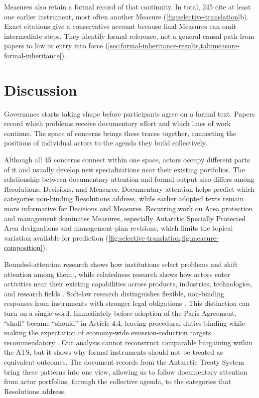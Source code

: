 \documentclass{fun_article}
\begin{document}
Measures also retain a formal record of that continuity. In total, 245 cite at least one earlier instrument, most often another Measure (\cref{fig:selective-translation}b). Exact citations give a conservative account because final Measures can omit intermediate steps. They identify formal reference, not a general causal path from papers to law or entry into force (\cref{sec:formal-inheritance-results,tab:measure-formal-inheritance}).

\section{Discussion}
Governance starts taking shape before participants agree on a formal text. Papers record which problems receive documentary effort and which lines of work continue. The space of concerns brings these traces together, connecting the positions of individual actors to the agenda they build collectively.

Although all 45 concerns connect within one space, actors occupy different parts of it and usually develop new specializations near their existing portfolios. The relationship between documentary attention and formal output also differs among Resolutions, Decisions, and Measures. Documentary attention helps predict which categories non-binding Resolutions address, while earlier adopted texts remain more informative for Decisions and Measures. Recurring work on Area protection and management dominates Measures, especially Antarctic Specially Protected Area designations and management-plan revisions, which limits the topical variation available for prediction (\cref{fig:selective-translation,fig:measure-composition}).

Bounded-attention research shows how institutions select problems and shift attention among them \cite{BaumgartnerJones1993,JonesBaumgartner2005,GreenPedersenWalgrave2014}, while relatedness research shows how actors enter activities near their existing capabilities across products, industries, technologies, and research fields \cite{Hidalgo2007,Neffke2011,Boschma2017,Guevara2016}. Soft-law research distinguishes flexible, non-binding responses from instruments with stronger legal obligations \cite{AbbottSnidal2000}. This distinction can turn on a single word. Immediately before adoption of the Paris Agreement, ``shall'' became ``should'' in Article 4.4, leaving procedural duties binding while making the expectation of economy-wide emission-reduction targets recommendatory \cite{Bodansky2016ParisLegalCharacter,Rajamani2016ParisAgreement}. Our analysis cannot reconstruct comparable bargaining within the ATS, but it shows why formal instruments should not be treated as equivalent outcomes. The document records from the Antarctic Treaty System bring these patterns into one view, allowing us to follow documentary attention from actor portfolios, through the collective agenda, to the categories that Resolutions address.
\end{document}
